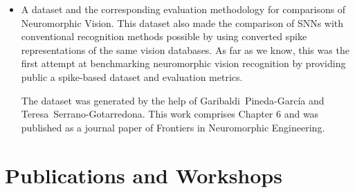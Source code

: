 \begin{itemize}
	\item 
	A dataset and the corresponding evaluation methodology for comparisons of Neuromorphic Vision.
	This dataset also made the comparison of SNNs with conventional recognition methods possible by using converted spike representations of the same vision databases.
	As far as we know, this was the first attempt at benchmarking neuromorphic vision recognition by providing public a spike-based dataset and evaluation metrics.
	
	The dataset was generated by the help of Garibaldi~Pineda-Garc\'ia and Teresa~Serrano-Gotarredona.
	This work comprises Chapter 6 and was published as a journal paper of Frontiers in Neuromorphic Engineering.
\end{itemize}

   
\section{Publications and Workshops}
